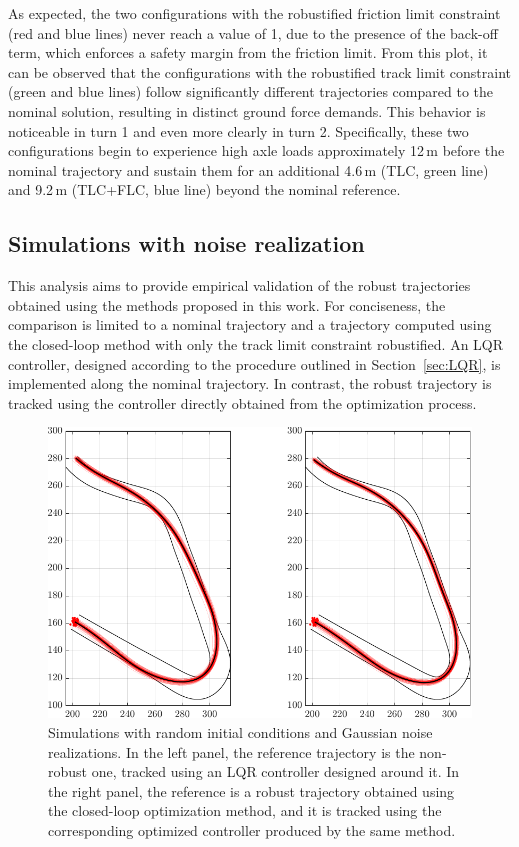 As expected, the two configurations with the robustified friction limit constraint (red and blue lines) never reach a value of 1, due to the presence of the back-off term, which enforces a safety margin from the friction limit. 
From this plot, it can be observed that the configurations with the robustified track limit constraint (green and blue lines) follow significantly different trajectories compared to the nominal solution, resulting in distinct ground force demands. This behavior is noticeable in turn 1 and even more clearly in turn 2. Specifically, these two configurations begin to experience high axle loads approximately 12\,m before the nominal trajectory and sustain them for an additional 4.6\,m (TLC, green line) and 9.2\,m (TLC+FLC, blue line) beyond the nominal reference. 

\subsection{Simulations with noise realization}
This analysis aims to provide empirical validation of the robust trajectories obtained using the methods proposed in this work. For conciseness, the comparison is limited to a nominal trajectory and a trajectory computed using the closed-loop method with only the track limit constraint robustified.
An LQR controller, designed according to the procedure outlined in Section~\ref{sec:LQR}, is implemented along the nominal trajectory. In contrast, the robust trajectory is tracked using the controller directly obtained from the optimization process.

\begin{figure}
	\centering
	\includegraphics{Fig/olcl_traj_strings.pdf}
	\caption{Simulations with random initial conditions and Gaussian noise realizations. In the left panel, the reference trajectory is the non-robust one, tracked using an LQR controller designed around it. In the right panel, the reference is a robust trajectory obtained using the closed-loop optimization method, and it is tracked using the corresponding optimized controller produced by the same method.}
	\label{fig:traj_strings}
\end{figure}